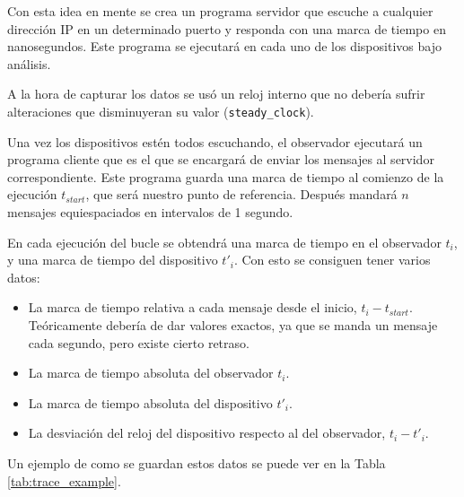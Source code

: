 Con esta idea en mente se crea un programa servidor que escuche a cualquier dirección IP en un determinado puerto y responda con una marca de tiempo en nanosegundos. Este programa se ejecutará en cada uno de los dispositivos bajo análisis.

A la hora de capturar los datos se usó un reloj interno que no debería sufrir alteraciones que disminuyeran su valor (\texttt{steady\_clock}\cite{steadyclockcpp}).

Una vez los dispositivos estén todos escuchando, el observador ejecutará un programa cliente que es el que se encargará de enviar los mensajes al servidor correspondiente. Este programa guarda una marca de tiempo al comienzo de la ejecución $t_{start}$, que será nuestro punto de referencia. Después mandará $n$ mensajes equiespaciados en intervalos de 1 segundo.

En cada ejecución del bucle se obtendrá una marca de tiempo en el observador $t_i$, y una marca de tiempo del dispositivo $t'_i$. Con esto se consiguen tener varios datos:
\begin{itemize}
    \item La marca de tiempo relativa a cada mensaje desde el inicio, $t_i - t_{start}$. Teóricamente debería de dar valores exactos, ya que se manda un mensaje cada segundo, pero existe cierto retraso.
    \item La marca de tiempo absoluta del observador $t_i$.
    \item La marca de tiempo absoluta del dispositivo $t'_i$.
    \item La desviación del reloj del dispositivo respecto al del observador, $t_i - t'_i$.
\end{itemize}

Un ejemplo de como se guardan estos datos se puede ver en la Tabla \ref{tab:trace_example}.
\begin{table}
    \centering
    \caption{Ejemplo de los datos obtenidos de cada dispositivo}
    \label{tab:trace_example}
\end{table}

